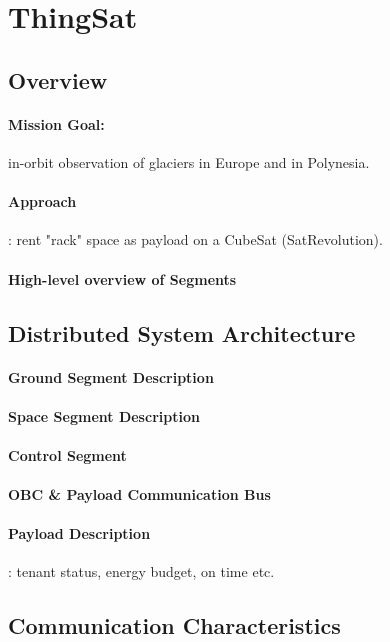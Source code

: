 \section{ThingSat}
\label{sec:case-study}

\subsection{Overview}
\paragraph*{Mission Goal:} in-orbit observation of glaciers in Europe and in Polynesia.
\paragraph*{Approach}: rent "rack" space as payload on a CubeSat (SatRevolution).
\paragraph*{High-level overview of Segments}

\subsection{Distributed System Architecture}
\paragraph*{Ground Segment Description}
\paragraph*{Space Segment Description}
\paragraph*{Control Segment} %
\paragraph*{OBC \& Payload Communication Bus}
\paragraph*{Payload Description}: tenant status, energy budget, on time etc.

\subsection{Communication Characteristics}
